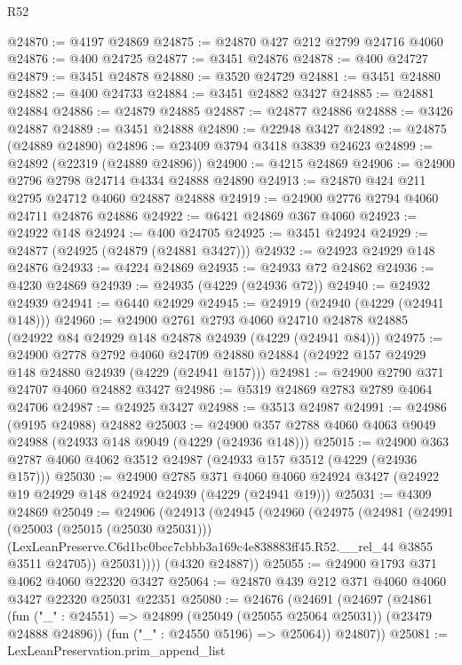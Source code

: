 \begin{lexlean}{R52}
\begin{coremodule}
@24870 := @4197 @24869
@24875 := @24870 @427 @212 @2799 @24716 @4060
@24876 := @400 @24725
@24877 := @3451 @24876
@24878 := @400 @24727
@24879 := @3451 @24878
@24880 := @3520 @24729
@24881 := @3451 @24880
@24882 := @400 @24733
@24884 := @3451 @24882 @3427
@24885 := @24881 @24884
@24886 := @24879 @24885
@24887 := @24877 @24886
@24888 := @3426 @24887
@24889 := @3451 @24888
@24890 := @22948 @3427
@24892 := @24875 (@24889 @24890)
@24896 := @23409 @3794 @3418 @3839 @24623
@24899 := @24892 (@22319 (@24889 @24896))
@24900 := @4215 @24869
@24906 := @24900 @2796 @2798 @24714 @4334 @24888 @24890
@24913 := @24870 @424 @211 @2795 @24712 @4060 @24887 @24888
@24919 := @24900 @2776 @2794 @4060 @24711 @24876 @24886
@24922 := @6421 @24869 @367 @4060
@24923 := @24922 @148
@24924 := @400 @24705
@24925 := @3451 @24924
@24929 := @24877 (@24925 (@24879 (@24881 @3427)))
@24932 := @24923 @24929 @148 @24876
@24933 := @4224 @24869
@24935 := @24933 @72 @24862
@24936 := @4230 @24869
@24939 := @24935 (@4229 (@24936 @72))
@24940 := @24932 @24939
@24941 := @6440 @24929
@24945 := @24919 (@24940 (@4229 (@24941 @148)))
@24960 := @24900
    @2761
    @2793
    @4060
    @24710
    @24878
    @24885
    (@24922 @84 @24929 @148 @24878 @24939 (@4229 (@24941 @84)))
@24975 := @24900
    @2778
    @2792
    @4060
    @24709
    @24880
    @24884
    (@24922 @157 @24929 @148 @24880 @24939 (@4229 (@24941 @157)))
@24981 := @24900 @2790 @371 @24707 @4060 @24882 @3427
@24986 := @5319 @24869 @2783 @2789 @4064 @24706
@24987 := @24925 @3427
@24988 := @3513 @24987
@24991 := @24986 (@9195 @24988) @24882
@25003 := @24900 @357 @2788 @4060 @4063 @9049 @24988 (@24933 @148 @9049 (@4229 (@24936 @148)))
@25015 := @24900 @363 @2787 @4060 @4062 @3512 @24987 (@24933 @157 @3512 (@4229 (@24936 @157)))
@25030 := @24900
    @2785
    @371
    @4060
    @4060
    @24924
    @3427
    (@24922 @19 @24929 @148 @24924 @24939 (@4229 (@24941 @19)))
@25031 := @4309 @24869
@25049 := @24906
    (@24913
      (@24945
        (@24960
          (@24975
            (@24981
              (@24991
                (@25003 (@25015 (@25030 @25031)))
                (LexLeanPreserve.C6d1bc0bcc7cbbb3a169c4e838883ff45.R52.__rel_44 @3855 @3511 @24705))
              @25031))))
      (@4320 @24887))
@25055 := @24900 @1793 @371 @4062 @4060 @22320 @3427
@25064 := @24870 @439 @212 @371 @4060 @4060 @3427 @22320 @25031 @22351
@25080 := @24676
    (@24691
      (@24697
        (@24861
          (fun ("_" : @24551) => @24899 (@25049 (@25055 @25064 @25031)) (@23479 @24888 @24896))
          (fun ("_" : @24550 @5196) => @25064))
        @24807))
@25081 := LexLeanPreservation.prim_append_list

\end{coremodule}
\end{lexlean}

